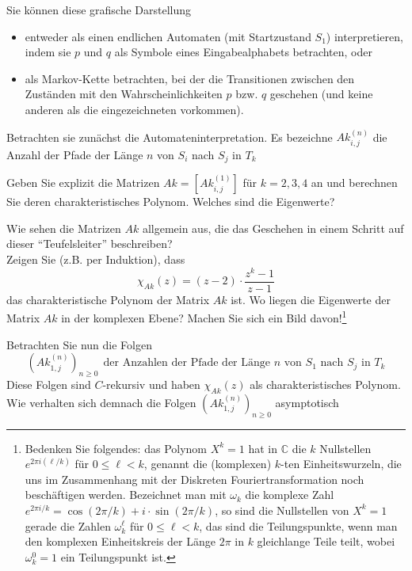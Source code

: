 Sie können diese grafische Darstellung 
\begin{itemize}
\item
entweder als einen endlichen Automaten (mit Startzustand $S_1$) interpretieren,
indem sie $p$ und $q$ als Symbole eines Eingabealphabets betrachten, oder
\item
als Markov-Kette betrachten, bei der die Transitionen zwischen den Zuständen
mit den Wahrscheinlichkeiten $p$ bzw. $q$ geschehen (und keine anderen als die
eingezeichneten vorkommen).
\end{itemize}

Betrachten sie zunächst die Automateninterpretation. Es bezeichne
$Ak_{i,j}^{(n)}$ die Anzahl der Pfade der Länge $n$ von $S_i$ nach $S_j$ in
$T_k$

\begin{flushenum}
\item Geben Sie explizit die Matrizen $Ak = \left[ Ak_{i,j}^{(1)} \right]$ für
	$k=2,3,4$ an und berechnen Sie deren charakteristisches Polynom.
	Welches sind die Eigenwerte?
\item Wie sehen die Matrizen $Ak$ allgemein aus, die das Geschehen in einem
	Schritt auf dieser ``Teufelsleiter'' beschreiben?\\ Zeigen Sie (z.B.
	per Induktion), dass
	\[
	\chi_{Ak}(z) = (z-2) \cdot \frac{z^k-1}{z-1}
	\]
	das charakteristische Polynom der Matrix $Ak$ ist.  Wo liegen die
	Eigenwerte der Matrix $Ak$ in der komplexen Ebene?  Machen Sie sich ein
	Bild davon!\footnote{ Bedenken Sie folgendes: das Polynom $X^k=1$ hat
	in $\mathbb{C}$ die $k$ Nullstellen $e^{2 \pi i (\ell/k)}$ für $0 \leq
	\ell < k$, genannt die (komplexen) $k$-ten Einheitswurzeln, die uns im
	Zusammenhang mit der Diskreten Fouriertransformation noch beschäftigen
	werden. Bezeichnet man mit $\omega_k$ die komplexe Zahl $e^{2 \pi i
	/k}= \cos (2 \pi/k) + i \cdot \sin(2 \pi/k)$, so sind die Nullstellen
	von $X^k=1$ gerade die Zahlen $\omega_k^\ell$ für $0 \leq \ell < k$,
	das sind die Teilungspunkte, wenn man den komplexen Einheitskreis der
	Länge $2 \pi$ in $k$ gleichlange Teile teilt, wobei $\omega_k^0=1$ ein
	Teilungspunkt ist.}
\item Betrachten Sie nun die Folgen
	\[
	\left(Ak_{1,j}^{(n)}\right)_{n \geq 0}~~\text{der Anzahlen der Pfade 
	der Länge $n$ von $S_1$ nach $S_j$ in $T_k$}
	\]
	Diese Folgen sind $C$-rekursiv und haben $\chi_{Ak}(z)$ als
	charakteristisches Polynom. \\
	Wie verhalten sich demnach die Folgen $\left(Ak_{1,j}^{(n)}\right)_{n \geq 0}$ asymptotisch 

\end{flushenum}
